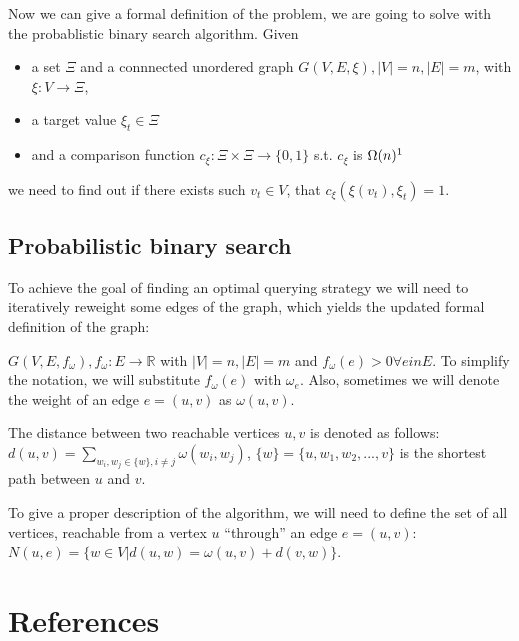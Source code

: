 Now we can give a formal definition of the problem, we are going to solve with the probablistic binary search algorithm.
Given
\begin{itemize}
  \item a set $\Xi$ and a connnected unordered graph $G(V, E, \xi), |V| = n, |E| = m$, with $\xi: V \rightarrow \Xi$,
  \item a target value $\xi_t \in \Xi$
  \item and a comparison function $c_\xi: \Xi \times \Xi \rightarrow \{0, 1\}$ s.t. $c_\xi$ is $\Omega(n)\footnotemark[1]$
\end{itemize}
we need to find out if there exists such $v_t \in V$, that $c_\xi(\xi(v_t), \xi_t) = 1$.

\subsection*{Probabilistic binary search}
To achieve the goal of finding an optimal querying strategy we will need to iteratively reweight some edges of the graph, which yields the updated formal definition of the graph:


$G(V, E, f_\omega), f_\omega: E \rightarrow \mathbb{R}$ with $|V| = n, |E| = m$ and $f_\omega(e) > 0 \forall e in E$. To simplify the notation, we will substitute $f_\omega(e)$ with $\omega_e$. Also, sometimes we will denote the weight of an edge $e = (u, v)$ as $\omega(u, v)$. 


The distance between two reachable vertices $u, v$ is denoted as follows: $d(u, v) = \sum \limits_{w_i, w_j \in \{w\}, i \ne j} \omega(w_i, w_j)$, $\{w\} = \{u, w_1, w_2, ..., v\}$ is the shortest path between $u$ and $v$.


To give a proper description of the algorithm, we will need to define the set of all vertices, reachable from a vertex $u$ ``through'' an edge $e = (u, v)$: $N(u, e) = \{ w \in V | d(u, w) = \omega(u, v) + d(v, w) \}$.


\section{References}
\nocite{main, karp, benor, annals}
\printbibliography[heading=none]
